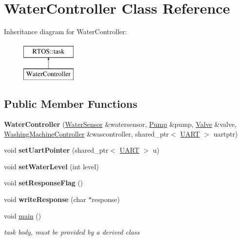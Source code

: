 \hypertarget{class_water_controller}{}\section{Water\+Controller Class Reference}
\label{class_water_controller}
Inheritance diagram for Water\+Controller\+:\begin{figure}[H]
\begin{center}
\leavevmode
\includegraphics[height=2.000000cm]{class_water_controller}
\end{center}
\end{figure}
\subsection*{Public Member Functions}
\begin{DoxyCompactItemize}
\item 
{\bfseries Water\+Controller} (\hyperlink{class_water_sensor}{Water\+Sensor} \&watersensor, \hyperlink{class_pump}{Pump} \&pump, \hyperlink{class_valve}{Valve} \&valve, \hyperlink{class_washing_machine_controller}{Washing\+Machine\+Controller} \&wascontroller, shared\+\_\+ptr$<$ \hyperlink{class_u_a_r_t}{U\+A\+RT} $>$ uartptr)\hypertarget{class_water_controller_a3c3e05d57fa688fc5183230d330141b3}{}\label{class_water_controller_a3c3e05d57fa688fc5183230d330141b3}

\item 
void {\bfseries set\+Uart\+Pointer} (shared\+\_\+ptr$<$ \hyperlink{class_u_a_r_t}{U\+A\+RT} $>$ u)\hypertarget{class_water_controller_a208f42ad1242b146d96fb19626feb811}{}\label{class_water_controller_a208f42ad1242b146d96fb19626feb811}

\item 
void {\bfseries set\+Water\+Level} (int level)\hypertarget{class_water_controller_a513f385f75e0e358e6fee6726c625454}{}\label{class_water_controller_a513f385f75e0e358e6fee6726c625454}

\item 
void {\bfseries set\+Response\+Flag} ()\hypertarget{class_water_controller_ada996735d82efcda3dd47016d08693e7}{}\label{class_water_controller_ada996735d82efcda3dd47016d08693e7}

\item 
void {\bfseries write\+Response} (char $\ast$response)\hypertarget{class_water_controller_a833f22a3c64097e8c557db7231c77e51}{}\label{class_water_controller_a833f22a3c64097e8c557db7231c77e51}

\item 
void \hyperlink{class_water_controller_a617fdcb283f49ef2e512a75fe5a72950}{main} ()
\begin{DoxyCompactList}\small\item\em task body, must be provided by a derived class \end{DoxyCompactList}\end{DoxyCompactItemize}

